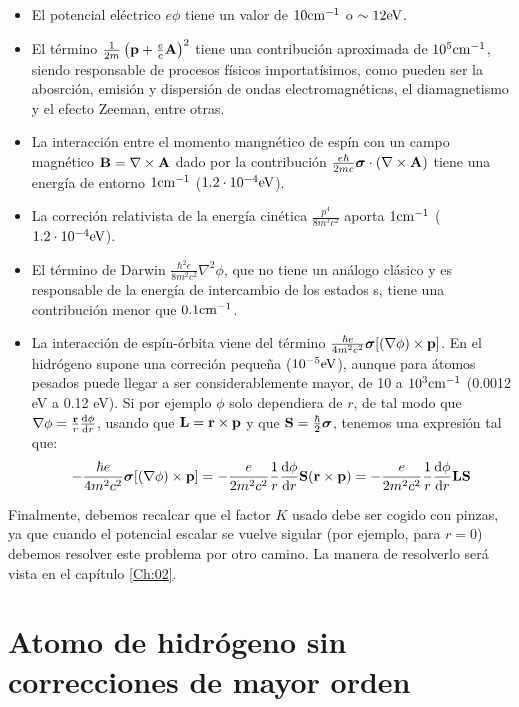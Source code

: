 \begin{itemize}
\item El potencial eléctrico $e\phi$ tiene un valor de $10\text{cm}^{-1}$ o $\sim 12 \text{eV}$.
\item El término $ \frac{1}{2m} \left( \mathbf{p}+\frac{e}{c}\mathbf{A} \right)^2$ tiene una contribución aproximada de $10^5 \text{cm}^{-1}$, siendo responsable de procesos físicos importatísimos, como pueden ser la abosrción, emisión y dispersión de ondas electromagnéticas, el diamagnetismo y el efecto Zeeman, entre otras.
\item La interacción entre el momento mangnético de espín con un campo magnético $\mathbf{B} = \nabla \times \mathbf{A}$ dado por la contribución $\frac{e\hbar}{2mc} \boldsymbol{\sigma} \cdot (\nabla \times \mathbf{A}) $ tiene una energía de entorno $1\text{cm}^{-1}$ ($1.2 \cdot 10^{-4} \text{eV}$). 
\item La correción relativista de la energía cinética $\frac{p^4}{8 m^3 c^2} $ aporta $1\text{cm}^{-1}$ ($1.2 \cdot 10^{-4} \text{eV}$).
\item El término de Darwin $\frac{\hbar^2 e}{8 m^2 c^2} \nabla^2 \phi$, que no tiene un análogo clásico y es responsable de la energía de intercambio de los estados s, tiene una contribución menor que $0.1\text{cm}^{-1}$.
\item La interacción de espín-órbita viene del término $\frac{ \hbar e}{4m^2 c^2} \boldsymbol{\sigma} [(\nabla \phi)\times \mathbf{p}]$. En el hidrógeno supone una correción pequeña ($10^{-5} \text{eV}$), aunque para átomos pesados puede llegar a ser considerablemente mayor, de 10 a $10^3 \text{cm}^{-1}$ (0.0012 eV a 0.12 eV). Si por ejemplo $\phi$ solo dependiera de $r$, de tal modo que $\nabla \phi = \frac{\mathbf{r}}{r} \frac{\mathrm{d} \phi}{\mathrm{d} r}$, usando que $\mathbf{L} = \mathbf{r} \times \mathbf{p}$ y que $\mathbf{S} = \frac{\hbar}{2} \boldsymbol{\sigma}$, tenemos una expresión tal que:
\begin{equation}
    -\frac{ \hbar e}{4m^2 c^2} \boldsymbol{\sigma} [(\nabla \phi)\times \mathbf{p}] = - \frac{e}{2m^2 c^2} \frac{1}{r} \frac{\mathrm{d} \phi}{\mathrm{d} r}  \mathbf{S} (\mathbf{r} \times \mathbf{p}) = - \frac{e}{2m^2 c^2} \frac{1}{r} \frac{\mathrm{d} \phi}{\mathrm{d} r} \mathbf{L} \mathbf{S} \label{Ec:01-03-16}
\end{equation}
\end{itemize}
Finalmente, debemos recalcar que el factor $K$ usado debe ser cogido con pinzas, ya que cuando el potencial escalar se vuelve sigular (por ejemplo, para $r=0$) debemos resolver este problema por otro camino. La manera de resolverlo será vista en el capítulo \ref{Ch:02}.

\section{Atomo de hidrógeno sin correcciones de mayor orden}

